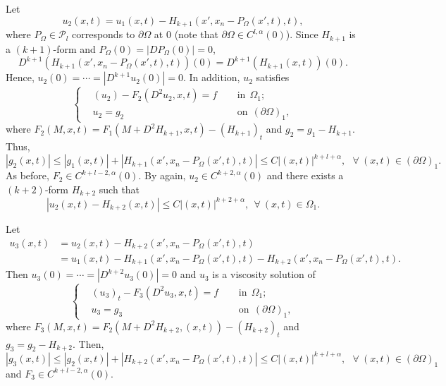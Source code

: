 \documentclass[preprint,12pt]{elsarticle}
\theoremstyle{definition}
\theoremstyle{remark}
\numberwithin{equation}{section}
\begin{document}
Let
\begin{equation*}
  u_2(x,t)=u_1(x,t)-H_{k+1}(x',x_n-P_{\Omega}(x',t),t),
\end{equation*}
where $P_{\Omega}\in \mathcal{P}_l$ corresponds to $\partial \Omega$ at $0$ (note that $\partial \Omega\in C^{l,\alpha}(0)$). Since $H_{k+1}$ is a $(k+1)$-form and $P_{\Omega}(0)=|DP_{\Omega}(0)|=0$,
\begin{equation*}
D^{k+1}(H_{k+1}(x',x_n-P_{\Omega}(x',t),t))(0)=D^{k+1}(H_{k+1}(x,t))(0).
\end{equation*}
Hence, $u_2(0)=\cdots= |D^{k+1}u_2(0)|=0$. In addition, $u_2$ satisfies
\begin{equation*}
\left\{\begin{aligned}
&(u_2)-F_2(D^2u_2,x,t)=f&& ~~\mbox{in}~~\Omega_1;\\
&u_2=g_2&& ~~\mbox{on}~~(\partial \Omega)_1,
\end{aligned}\right.
\end{equation*}
where $F_2(M,x,t)=F_1\left(M+D^2 H_{k+1},x,t\right)-(H_{k+1})_t$ and $g_2=g_1-H_{k+1}$. Thus,
\begin{equation*}
  |g_2(x,t)|\leq |g_1(x,t)|+|H_{k+1}(x',x_n-P_{\Omega}(x',t),t)|\leq C|(x,t)|^{k+l+\alpha},~~~\forall ~(x,t)\in (\partial \Omega)_1.
\end{equation*}
As before, $F_2 \in C^{k+l-2,\alpha}(0)$. By  again, $u_2\in C^{k+2,\alpha}(0)$ and there exists a $(k+2)$-form $H_{k+2}$ such that
\begin{equation*}
|u_2(x,t)-H_{k+2}(x,t)|\leq C |(x,t)|^{k+2+\alpha},~~\forall ~(x,t)\in \Omega_{1}.
\end{equation*}

Let
\begin{equation}\label{e.Ckla.u}
  \begin{aligned}
u_3(x,t)&=u_2(x,t)-H_{k+2}(x',x_n-P_{\Omega}(x',t),t)\\
  &=u_1(x,t)-H_{k+1}(x',x_n-P_{\Omega}(x',t),t)-H_{k+2}(x',x_n-P_{\Omega}(x',t),t).
  \end{aligned}
\end{equation}
Then $u_3(0)=\cdots=|D^{k+2}u_3(0)|=0$ and $u_3$ is a viscosity solution of
\begin{equation*}
\left\{\begin{aligned}
&(u_3)_t-F_3(D^2 u_3,x,t)=f&& ~~\mbox{in}~~\Omega_1;\\
&u_3=g_3&& ~~\mbox{on}~~(\partial \Omega)_1,
\end{aligned}\right.
\end{equation*}
where $F_3(M,x,t)=F_2\left(M+D^2 H_{k+2},(x,t)\right)-(H_{k+2})_t$ and $g_3=g_2-H_{k+2}$. Then,
\begin{equation*}
  |g_3(x,t)|\leq |g_2(x,t)|+|H_{k+2}(x',x_n-P_{\Omega}(x',t),t)|\leq C|(x,t)|^{k+l+\alpha},~~~\forall ~(x,t)\in (\partial \Omega)_1
\end{equation*}
and $F_3 \in C^{k+l-2,\alpha}(0)$.
\end{document}
